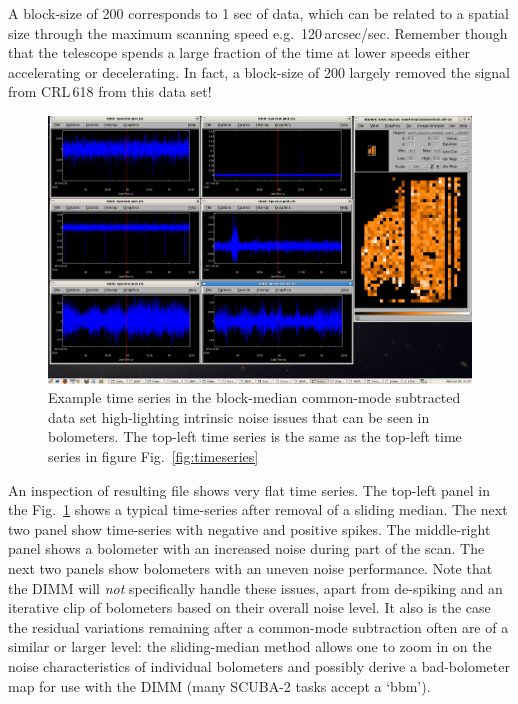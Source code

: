 \documentclass[twoside,11pt]{article}
\renewcommand{\_}{\texttt{\symbol{95}}}
\begin{document}
A block-size of 200 corresponds to 1 sec of data, which can be related
to a spatial size through the maximum scanning speed
e.g.\ 120\,arcsec/sec. Remember though that the telescope spends a large
fraction of the time at lower speeds either accelerating or
decelerating. In fact, a block-size of 200 largely removed the signal
from CRL\,618 from this data set!

\begin{figure}[ht]
\begin{center}
\includegraphics[width=1.0\linewidth]{sc19_timeseries2}
\caption{Example time series in the block-median common-mode
subtracted data set high-lighting intrinsic noise issues that can be
seen in bolometers. The top-left time series is the same as the
top-left time series in figure Fig.~\ref{fig:timeseries}}
\label{fig:timeseries2}
\end{center}
\end{figure}

An inspection of resulting file shows very flat time series. The
top-left panel in the Fig.~\ref{fig:timeseries2} shows a typical
time-series after removal of a sliding median. The next two panel show
time-series with negative and positive spikes. The middle-right panel
shows a bolometer with an increased noise during part of the scan. The
next two panels show bolometers with an uneven noise performance. Note
that the DIMM will \textsl{not} specifically handle these
issues, apart from de-spiking and an iterative clip of bolometers
based on their overall noise level.  It also is the case the residual
variations remaining after a common-mode subtraction often are of a
similar or larger level: the sliding-median method allows one to zoom
in on the noise characteristics of individual bolometers and possibly
derive a bad-bolometer map for use with the DIMM (many SCUBA-2
tasks accept a `bbm').
\end{document}
